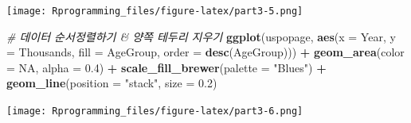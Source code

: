 \documentclass[10pt,]{krantz}
\makeatletter
\newenvironment{Shaded}{\begin{snugshade}}{\end{snugshade}}
\newcommand{\KeywordTok}[1]{\textcolor[rgb]{0.13,0.29,0.53}{\textbf{#1}}}
\newcommand{\DataTypeTok}[1]{\textcolor[rgb]{0.13,0.29,0.53}{#1}}
\newcommand{\FloatTok}[1]{\textcolor[rgb]{0.00,0.00,0.81}{#1}}
\newcommand{\StringTok}[1]{\textcolor[rgb]{0.31,0.60,0.02}{#1}}
\newcommand{\CommentTok}[1]{\textcolor[rgb]{0.56,0.35,0.01}{\textit{#1}}}
\newcommand{\OtherTok}[1]{\textcolor[rgb]{0.56,0.35,0.01}{#1}}
\newcommand{\OperatorTok}[1]{\textcolor[rgb]{0.81,0.36,0.00}{\textbf{#1}}}
\newcommand{\NormalTok}[1]{#1}
\newenvironment{kframe}{%
\medskip{}
\setlength{\fboxsep}{.8em}
 \def\at@end@of@kframe{}%
 \ifinner\ifhmode%
  \def\at@end@of@kframe{\end{minipage}}%
  \begin{minipage}{\columnwidth}%
 \fi\fi%
 \def\FrameCommand##1{\hskip\@totalleftmargin \hskip-\fboxsep
 \colorbox{shadecolor}{##1}\hskip-\fboxsep
     \hskip-\linewidth \hskip-\@totalleftmargin \hskip\columnwidth}%
 \MakeFramed {\advance\hsize-\width
   \@totalleftmargin\z@ \linewidth\hsize
   \@setminipage}}%
 {\par\unskip\endMakeFramed%
 \at@end@of@kframe}
\renewenvironment{Shaded}{\begin{kframe}}{\end{kframe}}
\theoremstyle{definition}
\theoremstyle{definition}
\theoremstyle{remark}
\makeatother
\begin{document}
\begin{Shaded}
\end{Shaded}

\texttt{[image: Rprogramming\_files/figure-latex/part3-5.png]}

\begin{Shaded}
\begin{Highlighting}[]


\CommentTok{# 데이터 순서정렬하기 & 양쪽 테두리 지우기 }
\KeywordTok{ggplot}\NormalTok{(uspopage, }\KeywordTok{aes}\NormalTok{(}\DataTypeTok{x =}\NormalTok{ Year, }\DataTypeTok{y =}\NormalTok{ Thousands, }\DataTypeTok{fill =}\NormalTok{ AgeGroup, }\DataTypeTok{order =} \KeywordTok{desc}\NormalTok{(AgeGroup))) }\OperatorTok{+}\StringTok{ }
\StringTok{  }\KeywordTok{geom_area}\NormalTok{(}\DataTypeTok{color =} \OtherTok{NA}\NormalTok{, }\DataTypeTok{alpha =} \FloatTok{0.4}\NormalTok{) }\OperatorTok{+}\StringTok{ }\KeywordTok{scale_fill_brewer}\NormalTok{(}\DataTypeTok{palette =} \StringTok{"Blues"}\NormalTok{) }\OperatorTok{+}\StringTok{ }\KeywordTok{geom_line}\NormalTok{(}\DataTypeTok{position =} \StringTok{"stack"}\NormalTok{, }\DataTypeTok{size =} \FloatTok{0.2}\NormalTok{)}
\end{Highlighting}
\end{Shaded}

\texttt{[image: Rprogramming\_files/figure-latex/part3-6.png]}
\end{document}
